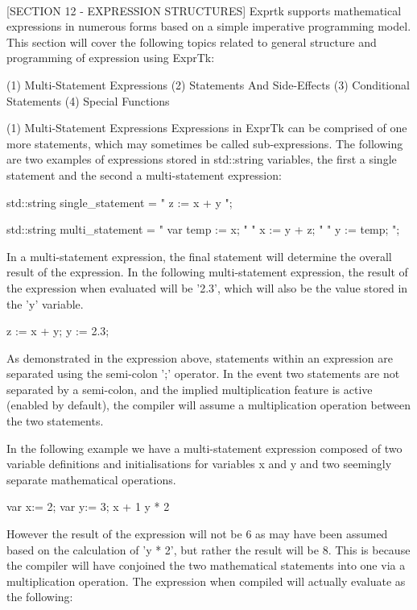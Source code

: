 ~~~~~~~~~~~~~~~~~~~~~~~~~~~~~~~~~~~~~~~~~~~~~~~~~~~~~~~~~~

[SECTION 12 - EXPRESSION STRUCTURES]
Exprtk supports mathematical expressions in numerous forms based on  a
simple  imperative  programming  model. This  section  will  cover the
following  topics  related  to general  structure  and  programming of
expression using ExprTk:

(1) Multi-Statement Expressions
(2) Statements And Side-Effects
(3) Conditional Statements
(4) Special Functions


(1) Multi-Statement Expressions
Expressions in ExprTk can be  comprised of one more statements,  which
may  sometimes  be  called  sub-expressions.  The  following  are  two
examples of expressions stored  in std::string variables, the  first a
single statement and the second a multi-statement expression:

std::string single\_statement = " z := x + y ";

std::string multi\_statement  = " var temp := x; "
" x := y + z;    "
" y := temp;     ";


In a  multi-statement expression,  the final  statement will determine
the overall result of the expression. In the following multi-statement
expression, the result of the expression when evaluated will be '2.3',
which will also be the value stored in the 'y' variable.

z := x + y;
y := 2.3;


As  demonstrated  in  the  expression  above,  statements  within   an
expression are  separated using  the semi-colon  ';' operator.  In the
event  two  statements are  not  separated by  a  semi-colon, and  the
implied multiplication  feature is  active (enabled  by default),  the
compiler  will  assume  a  multiplication  operation  between  the two
statements.

In the following example we have a multi-statement expression composed
of two variable definitions and initialisations for variables x and  y
and two seemingly separate mathematical operations.

var x:= 2;
var y:= 3;
x + 1
y * 2


However the result of  the expression will not  be 6 as may  have been
assumed based on  the calculation of  'y * 2',  but rather the  result
will be 8. This  is because the compiler  will have conjoined the  two
mathematical statements into one  via a multiplication operation.  The
expression when compiled will actually evaluate as the following:

